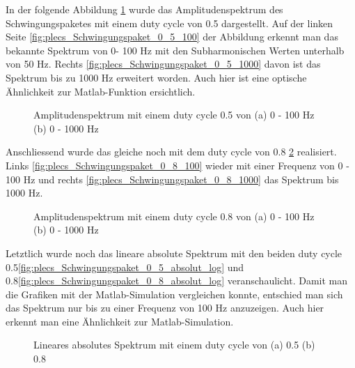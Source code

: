 In der folgende Abbildung \ref{fig:plecs_Schwingungspakete_Amplitudenspektrum_ 0_5_100_1000} wurde das Amplitudenspektrum des Schwingungspaketes mit einem duty cycle von 0.5 dargestellt. Auf der linken Seite \ref{fig:plecs_Schwingungspaket_0_5_100} der Abbildung erkennt man das bekannte Spektrum von 0- 100 Hz mit den Subharmonischen Werten unterhalb von 50 Hz. Rechts \ref{fig:plecs_Schwingungspaket_0_5_1000} davon ist das Spektrum bis zu 1000 Hz erweitert worden. Auch hier ist eine optische Ähnlichkeit zur  Matlab-Funktion ersichtlich.     
\begin{figure}[h]
	\centering
	\qquad
	\caption{Amplitudenspektrum mit einem duty cycle 0.5 von (a) 0 - 100 Hz (b) 0 - 1000 Hz}
	\label{fig:plecs_Schwingungspakete_Amplitudenspektrum_ 0_5_100_1000}
\end{figure}

Anschliessend wurde das gleiche noch mit dem duty cycle von 0.8 \ref{fig:plecs_Schwingungspakete_Amplitudenspektrum_ 0_8_100_1000} realisiert. Links \ref{fig:plecs_Schwingungspaket_0_8_100} wieder mit einer Frequenz von 0 - 100 Hz und rechts \ref{fig:plecs_Schwingungspaket_0_8_1000} das Spektrum bis 1000 Hz.
\begin{figure}[h]
	\centering
	\qquad
	\caption{Amplitudenspektrum mit einem duty cycle 0.8 von (a) 0 - 100 Hz (b) 0 - 1000 Hz}
	\label{fig:plecs_Schwingungspakete_Amplitudenspektrum_ 0_8_100_1000}
\end{figure}


Letztlich wurde noch das lineare absolute Spektrum mit den beiden duty cycle 0.5\ref{fig:plecs_Schwingungspaket_0_5_absolut_log} und 0.8\ref{fig:plecs_Schwingungspaket_0_8_absolut_log} veranschaulicht. Damit man die Grafiken mit der Matlab-Simulation vergleichen konnte, entschied man sich das Spektrum nur bis zu einer Frequenz von 100 Hz anzuzeigen. Auch hier erkennt man eine Ähnlichkeit zur Matlab-Simulation. 


\begin{figure}[h]
	\centering
	\qquad
	\caption{Lineares absolutes Spektrum mit einem duty cycle von (a) 0.5 (b) 0.8}
	\label{fig:plecs_Schwingungspakete_absolut log}
\end{figure}




 


